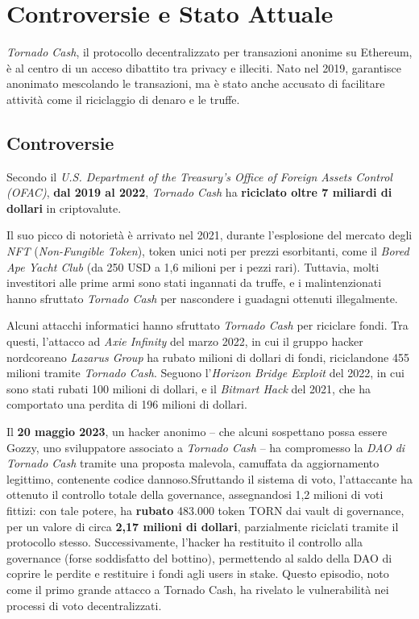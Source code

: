 \chapter{Controversie e Stato Attuale}

\textit{Tornado Cash}, il protocollo decentralizzato per transazioni anonime su Ethereum, è al centro di un acceso dibattito tra privacy e illeciti. Nato nel 2019, garantisce anonimato mescolando le transazioni, ma è stato anche accusato di facilitare attività come il riciclaggio di denaro e le truffe.

\section{Controversie}
Secondo il \textit{U.S. Department of the Treasury’s Office of Foreign Assets Control (OFAC)}, \textbf{dal 2019 al 2022}, \textit{Tornado Cash} ha \textbf{riciclato oltre 7 miliardi di dollari} in criptovalute\cite{treasury2023}.  

Il suo picco di notorietà è arrivato nel 2021, durante l’esplosione del mercato degli \textit{NFT} (\textit{Non-Fungible Token}), token unici noti per prezzi esorbitanti, come il \textit{Bored Ape Yacht Club} (da 250 USD a 1,6 milioni per i pezzi rari). Tuttavia, molti investitori alle prime armi sono stati ingannati da truffe, e i malintenzionati hanno sfruttato \textit{Tornado Cash} per nascondere i guadagni ottenuti illegalmente.

Alcuni attacchi informatici hanno sfruttato \textit{Tornado Cash} per riciclare fondi. Tra questi, l’attacco ad \textit{Axie Infinity} del marzo 2022, in cui il gruppo hacker nordcoreano \textit{Lazarus Group} ha rubato milioni di dollari di fondi, riciclandone 455 milioni tramite \textit{Tornado Cash}. Seguono l’\textit{Horizon Bridge Exploit} del 2022, in cui sono stati rubati 100 milioni di dollari, e il \textit{Bitmart Hack} del 2021, che ha comportato una perdita di 196 milioni di dollari.

Il \textbf{20 maggio 2023}, un hacker anonimo – che alcuni sospettano possa essere Gozzy, uno sviluppatore associato a \textit{Tornado Cash} – ha compromesso la \textit{DAO di Tornado Cash} tramite una proposta malevola, camuffata da aggiornamento legittimo, contenente codice dannoso.Sfruttando il sistema di voto, l’attaccante ha ottenuto il controllo totale della governance, assegnandosi 1,2 milioni di voti fittizi: con tale potere, ha \textbf{rubato} 483.000 token TORN dai vault di governance, per un valore di circa \textbf{2,17 milioni di dollari}, parzialmente riciclati tramite il protocollo stesso. Successivamente, l’hacker ha restituito il controllo alla governance (forse soddisfatto del bottino), permettendo al saldo della DAO di coprire le perdite e restituire i fondi agli users in stake. Questo episodio, noto come il primo grande attacco a Tornado Cash, ha rivelato le vulnerabilità nei processi di voto decentralizzati.

